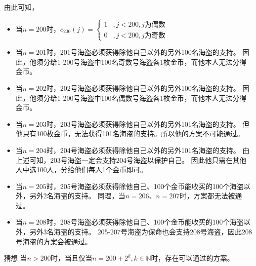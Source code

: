\begin{questions}
\begin{solution}
        由此可知，
        \begin{itemize}
            \item 当$n=200$时，$
                      c_{200}(j) = \begin{cases}
                          1 & , j<200 , j \text{为偶数} \\
                          0 & , j<200 , j \text{为奇数}
                      \end{cases}
                  $

            \item 当$n=201$时，201号海盗必须获得除他自己以外的另外100名海盗的支持。
                  因此，他须分给1-200号海盗中100名奇数号海盗各1枚金币，而他本人无法分得金币。

            \item 当$n=202$时，202号海盗必须获得除他自己以外的另外100名海盗的支持。
                  因此，他须分给1-200号海盗中100名偶数号海盗各1枚金币，而他本人无法分得金币。

            \item 当$n=203$时，203号海盗必须获得除他自己以外的另外101名海盗的支持。
                  但他只有100枚金币，无法获得101名海盗的支持。所以他的方案不可能通过。

            \item 当$n=204$时，204号海盗必须获得除他自己以外的另外101名海盗的支持。
                  由上述可知，203号海盗一定会支持204号海盗以保护自己。
                  因此他只需在其他人中选100人，分给他们每人1个金币即可。

            \item 当$n=205$时，205号海盗必须获得除他自己、100个金币能收买的100个海盗以外，另外2名海盗的支持。
                  同理，当$n=206$、$n=207$时，方案都无法被通过。

            \item 当$n=208$时，208号海盗必须获得除他自己、100个金币能收买的100个海盗以外，另外3名海盗的支持。
                  205-207号海盗为保命也会支持208号海盗，因此208号海盗的方案会被通过。

        \end{itemize}

        \textsf{猜想} \quad 当$n>200$时，当且仅当$n = 200 + 2^k,k\in \mathbb{N}$时，存在可以通过的方案。


\end{solution}
\end{questions}
